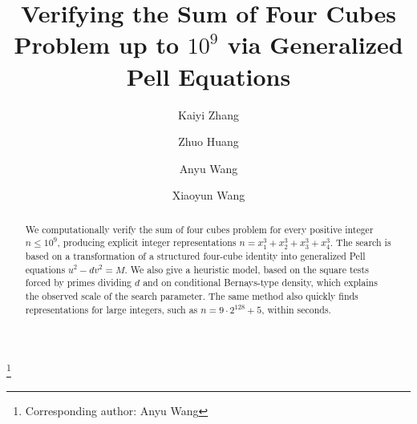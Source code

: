 \documentclass{mcom-l}
\theoremstyle{definition}
\theoremstyle{remark}
\numberwithin{equation}{section}
\begin{document}
\raggedbottom

\title[Four cubes up to \(10^9\)]{Verifying the Sum of Four Cubes Problem up to \(10^9\) via Generalized Pell Equations}

\author{Kaiyi Zhang}
\address{Institute for Advanced Study, Tsinghua University, Beijing, China}

\author{Zhuo Huang}
\address{School of Computer Science, Shanghai Jiao Tong University, Shanghai, China}

\author{Anyu Wang}
\address{Institute for Advanced Study, Tsinghua University, Beijing, China; State Key Laboratory of Cryptography and Digital Economy Security, Tsinghua University, Beijing, China; School of Cryptologic Science and Engineering, Shandong University, Jinan, China; Zhongguancun Laboratory, Beijing, China; National Financial Cryptography Research Center, Beijing, China}
\thanks{Corresponding author: Anyu Wang}

\author{Xiaoyun Wang}
\address{Institute for Advanced Study, Tsinghua University, Beijing, China; State Key Laboratory of Cryptography and Digital Economy Security, Tsinghua University, Beijing, China; School of Cryptologic Science and Engineering, Shandong University, Jinan, China; Zhongguancun Laboratory, Beijing, China; National Financial Cryptography Research Center, Beijing, China; Shandong Institute of Blockchain, Shandong, China}

\date{}


\begin{abstract}
We computationally verify the sum of four cubes problem for every positive
integer $n \leq 10^9$, producing explicit integer representations
$n=x_1^3+x_2^3+x_3^3+x_4^3$.  The search is based on a transformation of a
structured four-cube identity into generalized Pell equations
$u^2-d v^2=M$.  We also give a heuristic model, based on the square tests
forced by primes dividing $d$ and on conditional Bernays-type density, which
explains the observed scale of the search parameter.  The same method also
quickly finds representations for large integers, such as
$n=9\cdot 2^{128}+5$, within seconds.
\end{abstract}
\end{document}
